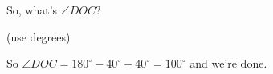 So, what's $\angle DOC?$

(use degrees)

















So $\angle DOC = 180^\circ - 40^\circ - 40^\circ = 100^\circ$ and we're done.


% 





